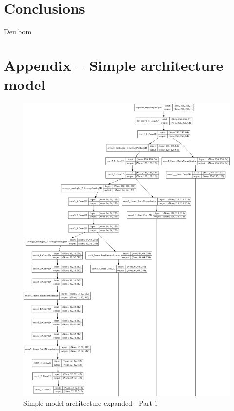 \documentclass[12pt,openright,oneside,a4paper,english]{abntex2}
\begin{document}
\begin{otherlanguage}{english}
\chapter{Conclusions}
Deu bom

\appendix
\chapter{Appendix -- Simple architecture model}

\begin{figure}[!htb]
\centering
\includegraphics[height=\textheight]{model_plot/Simple1}
\caption{Simple model architecture expanded - Part 1}
\label{simple_plot_1}
\end{figure}


\end{otherlanguage}
\end{document}
